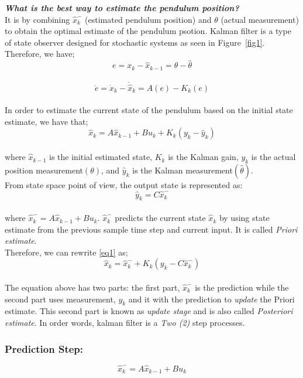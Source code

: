 \documentclass{article}
\begin{document}
\textbf{\emph{What is the best way to estimate the pendulum position?}}\\
\indent It is by combining $\hat{x}^{-}_{k}$ (estimated pendulum position) and $\theta$ (actual measurement) to obtain the optimal estimate of the pendulum psotion. Kalman filter is a type of state observer designed for stochastic systems as seen in Figure~\ref{fig1}. Therefore, we have;\\
$$e = x_{k} - \hat{x}_{k-1} = \theta - \hat{\theta}$$ \\
$$\dot{e} = \dot{x}_{k} - \dot{\hat{x}}_{k} = A(e) - K_{k}(e)$$\\
In order to estimate the current state of the pendulum based on the initial state estimate, we have that;\\
$$\hat{x}_{k} = A \hat{x}_{k-1} + Bu_{k} + K_{k}(y_{k} - \hat{y}_{k})$$\\
where $\hat{x}_{k-1}$ is the initial estimated state, $K_{k}$ is the Kalman gain, $y_{k}$ is the actual position measurement$(\theta)$, and $\hat{y}_{k}$ is the Kalman measurement$(\hat{\theta})$.\\
From state space point of view, the output state is represented as:\\
$$\hat{y}_{k} = C \hat{x}^{-}_{k}$$\\
where $\hat{x}^{-}_{k} = A \hat{x}_{k-1} + Bu_{k}$. $\hat{x}^{-}_{k}$ predicts the current state $\hat{x}_{k}$ by using state estimate from the previous sample time step and current input. It is called \emph{Priori estimate}.\\
Therefore, we can rewrite \ref{eq1} as;
$$\hat{x}_{k} = \hat{x}^{-}_{k} + K_{k}(y_{k} - C \hat{x}^{-}_{k})$$ \\
The equation above has two parts: the first part, $\hat{x}^{-}_{k}$ is the prediction while the second part uses measurement, $y_{k}$ and  it with the prediction to \emph{update} the Priori estimate. This second part is known as \emph{update stage} and is also called \emph{Posteriori estimate}. In order words, kalman filter is a \emph{Two (2)} step processes.\\

\subsubsection{Prediction Step:}
\begin{equation}
\label{eq3}
\hat{x}^{-}_{k} = A \hat{x}_{k-1} + Bu_{k}
\end{equation}
\end{document}
